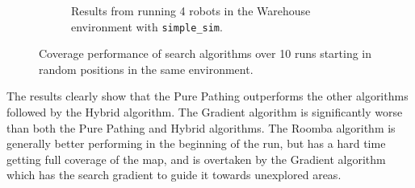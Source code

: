 \begin{figure}[H]
\begin{subfigure}[b]{0.49\textwidth}
      \caption{Results from running 4 robots in the Warehouse environment with \texttt{simple\_sim}.}
  \end{subfigure}
    \caption{Coverage performance of search algorithms over 10 runs starting in random positions in the same environment.}
    \label{fig:coverage-benchmark}
\end{figure}

The results clearly show that the Pure Pathing outperforms the other algorithms followed by the Hybrid algorithm. The Gradient algorithm is significantly worse than both the Pure Pathing and Hybrid algorithms. The Roomba algorithm is generally better performing in the beginning of the run, but has a hard time getting full coverage of the map, and is overtaken by the Gradient algorithm which has the search gradient to guide it towards unexplored areas.


